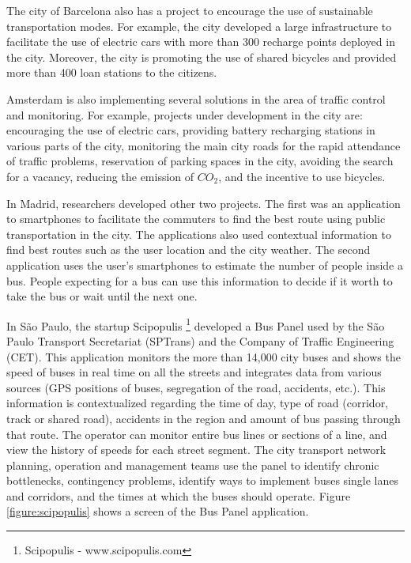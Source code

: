 The city of Barcelona also has a project to encourage the use of sustainable transportation modes. For example, the city developed a large infrastructure to facilitate the use of electric cars with more than 300 recharge points deployed in the city. Moreover, the city is promoting the use of shared bicycles and provided more than 400 loan stations to the citizens.

Amsterdam is also implementing several solutions in the area of traffic control and monitoring. For example, projects under development in the city are: encouraging the use of electric cars, providing battery recharging stations in various parts of the city, monitoring the main city roads for the rapid attendance of traffic problems, reservation of parking spaces in the city, avoiding the search for a vacancy, reducing the emission of $CO_2$, and the incentive to use bicycles.

In Madrid, researchers developed other two projects. The first was an application to smartphones to facilitate the commuters to find the best route using public transportation in the city. The applications also used contextual information to find best routes such as the user location and the city weather. The second application uses the user's smartphones to estimate the number of people inside a bus. People expecting for a bus can use this information to decide if it worth to take the bus or wait until the next one.

In S\~ao Paulo, the startup Scipopulis \footnote{Scipopulis - www.scipopulis.com} developed a Bus Panel used by the São Paulo Transport Secretariat (SPTrans) and the Company of Traffic Engineering (CET). This application monitors the more than 14,000 city buses and shows the speed of buses in real time on all the streets and integrates data from various sources (GPS positions of buses, segregation of the road, accidents, etc.). This information is contextualized regarding the time of day, type of road (corridor, track or shared road), accidents in the region and amount of bus passing through that route. The operator can monitor entire bus lines or sections of a line, and view the history of speeds for each street segment. The city transport network planning, operation and management teams use the panel to identify chronic bottlenecks, contingency problems, identify ways to implement buses single lanes and corridors, and the times at which the buses should operate. Figure \ref{figure:scipopulis} shows a screen of the Bus Panel application.

